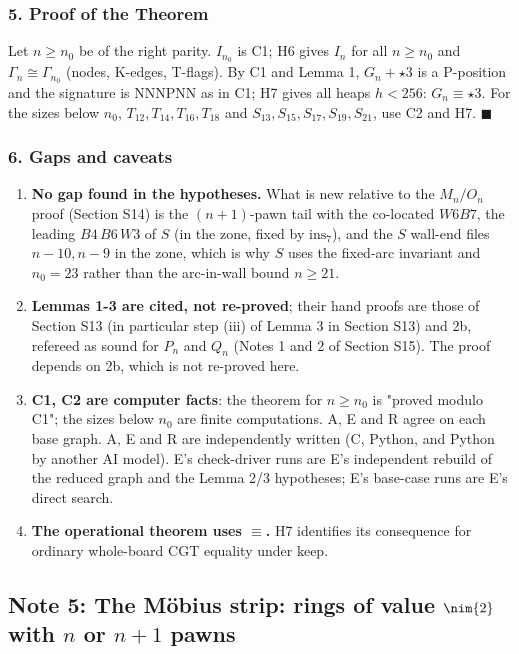 \subsubsection*{5. Proof of the Theorem}
Let $n\ge n_0$ be of the right parity. $I_{n_0}$ is C1; H6 gives $I_n$ for all $n\ge n_0$ and $\Gamma_n\cong\Gamma_{n_0}$ (nodes, K-edges, T-flags). By C1 and Lemma 1, $G_n+\star3$ is a P-position and the signature is NNNPNN as in C1; H7 gives all heaps $h<256$: $G_n\equiv\star3$. For the sizes below $n_0$, $T_{12},T_{14},T_{16},T_{18}$ and $S_{13},S_{15},S_{17},S_{19},S_{21}$, use C2 and H7. $\blacksquare$

\subsubsection*{6. Gaps and caveats}
\begin{enumerate}
\item \textbf{No gap found in the hypotheses.} What is new relative to the $M_n/O_n$ proof (Section S14) is the $(n+1)$-pawn tail with the co-located $W6B7$, the leading $B4\,B6\,W3$ of $S$ (in the zone, fixed by $\mathrm{ins}_7$), and the $S$ wall-end files $n-10,n-9$ in the zone, which is why $S$ uses the fixed-arc invariant and $n_0=23$ rather than the arc-in-wall bound $n\ge21$.
\item \textbf{Lemmas 1-3 are cited, not re-proved}; their hand proofs are those of Section S13 (in particular step (iii) of Lemma 3 in Section S13) and 2b, refereed as sound for $P_n$ and $Q_n$ (Notes 1 and 2 of Section S15). The proof depends on 2b, which is not re-proved here.
\item \textbf{C1, C2 are computer facts}: the theorem for $n\ge n_0$ is "proved modulo C1"; the sizes below $n_0$ are finite computations. A, E and R agree on each base graph. A, E and R are independently written (C, Python, and Python by another AI model). E's check-driver runs are E's independent rebuild of the reduced graph and the Lemma 2/3 hypotheses; E's base-case runs are E's direct search.
\item \textbf{The operational theorem uses $\equiv$.} H7 identifies its consequence for ordinary whole-board CGT equality under keep.
\end{enumerate}

\subsection{Note 5: The M\"obius strip: rings of value $\nim{2}$ with $n$ or $n+1$ pawns}


